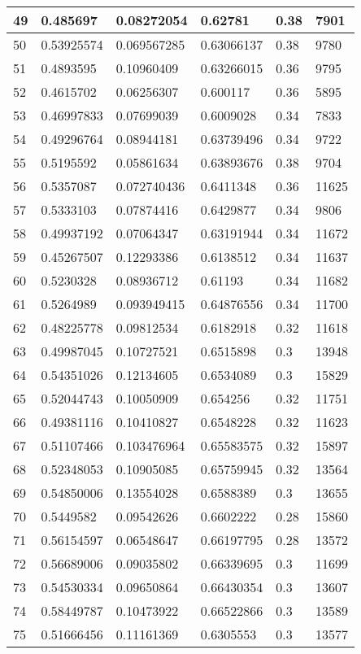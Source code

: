 \begin{longtable}{|l|l|l|l|l|l|}
49 & 0.485697 & 0.08272054 & 0.62781 & 0.38 & 7901 \\ \hline 
50 & 0.53925574 & 0.069567285 & 0.63066137 & 0.38 & 9780 \\ \hline 
51 & 0.4893595 & 0.10960409 & 0.63266015 & 0.36 & 9795 \\ \hline 
52 & 0.4615702 & 0.06256307 & 0.600117 & 0.36 & 5895 \\ \hline 
53 & 0.46997833 & 0.07699039 & 0.6009028 & 0.34 & 7833 \\ \hline 
54 & 0.49296764 & 0.08944181 & 0.63739496 & 0.34 & 9722 \\ \hline 
55 & 0.5195592 & 0.05861634 & 0.63893676 & 0.38 & 9704 \\ \hline 
56 & 0.5357087 & 0.072740436 & 0.6411348 & 0.36 & 11625 \\ \hline 
57 & 0.5333103 & 0.07874416 & 0.6429877 & 0.34 & 9806 \\ \hline 
58 & 0.49937192 & 0.07064347 & 0.63191944 & 0.34 & 11672 \\ \hline 
59 & 0.45267507 & 0.12293386 & 0.6138512 & 0.34 & 11637 \\ \hline 
60 & 0.5230328 & 0.08936712 & 0.61193 & 0.34 & 11682 \\ \hline 
61 & 0.5264989 & 0.093949415 & 0.64876556 & 0.34 & 11700 \\ \hline 
62 & 0.48225778 & 0.09812534 & 0.6182918 & 0.32 & 11618 \\ \hline 
63 & 0.49987045 & 0.10727521 & 0.6515898 & 0.3 & 13948 \\ \hline 
64 & 0.54351026 & 0.12134605 & 0.6534089 & 0.3 & 15829 \\ \hline 
65 & 0.52044743 & 0.10050909 & 0.654256 & 0.32 & 11751 \\ \hline 
66 & 0.49381116 & 0.10410827 & 0.6548228 & 0.32 & 11623 \\ \hline 
67 & 0.51107466 & 0.103476964 & 0.65583575 & 0.32 & 15897 \\ \hline 
68 & 0.52348053 & 0.10905085 & 0.65759945 & 0.32 & 13564 \\ \hline 
69 & 0.54850006 & 0.13554028 & 0.6588389 & 0.3 & 13655 \\ \hline 
70 & 0.5449582 & 0.09542626 & 0.6602222 & 0.28 & 15860 \\ \hline 
71 & 0.56154597 & 0.06548647 & 0.66197795 & 0.28 & 13572 \\ \hline 
72 & 0.56689006 & 0.09035802 & 0.66339695 & 0.3 & 11699 \\ \hline 
73 & 0.54530334 & 0.09650864 & 0.66430354 & 0.3 & 13607 \\ \hline 
74 & 0.58449787 & 0.10473922 & 0.66522866 & 0.3 & 13589 \\ \hline 
75 & 0.51666456 & 0.11161369 & 0.6305553 & 0.3 & 13577 \\ \hline 
\end{longtable}